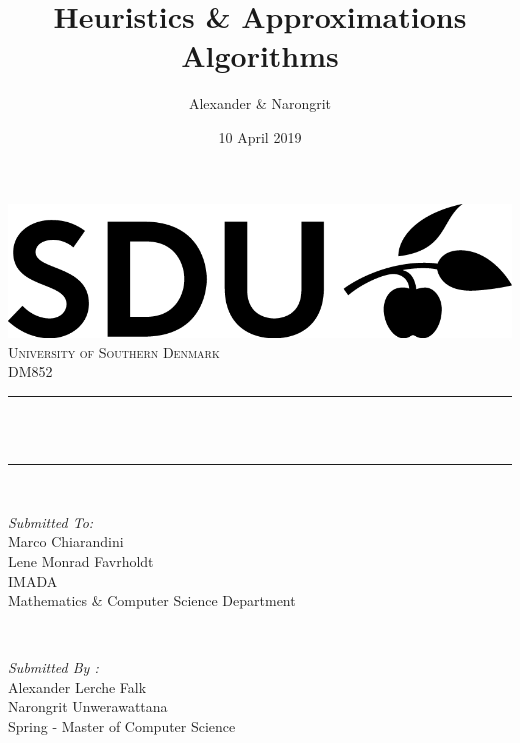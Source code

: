 \documentclass[12pt]{article}
\title{Heuristics \& Approximations Algorithms}								%
\author{Alexander \& Narongrit}								%
\date{10 April 2019}											%
\makeatletter
\let\thetitle\@title
\makeatother
\begin{document}

\begin{titlepage}
	\centering
    \vspace*{0.5 cm}
    \includegraphics[scale = 0.5]{SDU_logo.png}\\[1.0 cm]	%
    \textsc{\LARGE University of Southern Denmark}\\[2.0 cm]	%
	\textsc{\Large DM852}\\[0.5 cm]				%
	\rule{\linewidth}{0.2 mm} \\[0.4 cm]
	{ \huge \bfseries \thetitle}\\
	\rule{\linewidth}{0.2 mm} \\[1.5 cm]
	
	\begin{minipage}{0.4\textwidth}
		\begin{flushleft} \large
			\emph{Submitted To:}\\
			Marco Chiarandini\\
            Lene Monrad Favrholdt \\
			IMADA \\
			Mathematics \& Computer Science Department \\
			\end{flushleft}
			\end{minipage}~
			\begin{minipage}{0.4\textwidth}
            
			\begin{flushright} \large
			\emph{Submitted By :} \\
			Alexander Lerche Falk\\
            Narongrit Unwerawattana\\
            Spring - Master of Computer Science\\
		\end{flushright}
        
	\end{minipage}\\[2 cm]
	
	
    
    
    
    
	
\end{titlepage}
\end{document}
